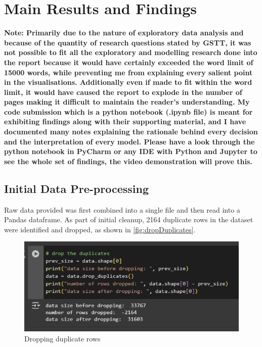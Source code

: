 \section{Main Results and Findings}\label{sec:mainResults}

\noindent \textbf{Note: Primarily due to the nature of exploratory data analysis and because of the quantity of research questions stated by GSTT, it was not possible to fit all the exploratory and modelling research done into the report because it would have certainly exceeded the word limit of 15000 words, while preventing me from explaining every salient point in the visualisations. Additionally even if made to fit within the word limit, it would have caused the report to explode in the number of pages making it difficult to maintain the reader's understanding. My code submission which is a python notebook (.ipynb file) is meant for exhibiting findings along with their supporting material, and I have documented many notes explaining the rationale behind every decision and the interpretation of every model. Please have a look through the python notebook in PyCharm or any IDE with Python and Jupyter to see the whole set of findings, the video demonstration will prove this.}

\subsection{Initial Data Pre-processing}
\noindent Raw data provided was first combined into a single file and then read into a Pandas dataframe. As part of initial cleanup, 2164 duplicate rows in the dataset were identified and dropped, as shown in \autoref{fig:dropDuplicates}. 

\begin{figure}[H]
		\centering
		\includegraphics[scale=0.8]{figures/python_code/drop_duplicate_rows.png}
		\caption{Dropping duplicate rows}
		\label{fig:dropDuplicates}
\end{figure}

